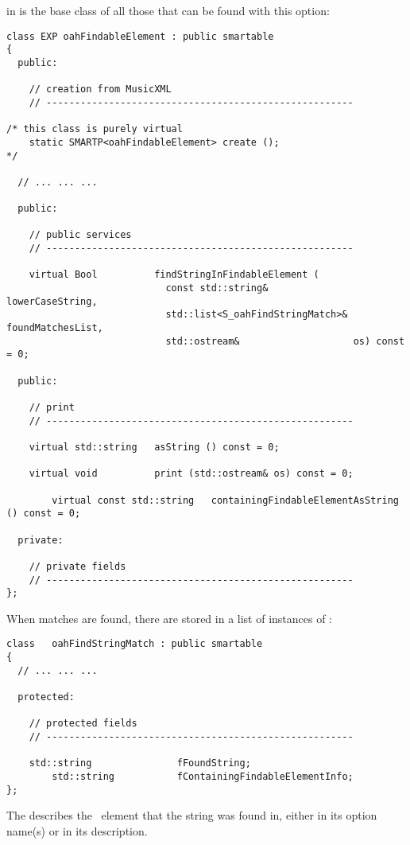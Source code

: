  in  is the base class   of all those that can be found with this  option:
\begin{lstlisting}[language=Terminal]
class EXP oahFindableElement : public smartable
{
  public:

    // creation from MusicXML
    // ------------------------------------------------------

/* this class is purely virtual
    static SMARTP<oahFindableElement> create ();
*/

  // ... ... ...

  public:

    // public services
    // ------------------------------------------------------

    virtual Bool          findStringInFindableElement (
                            const std::string&          lowerCaseString,
                            std::list<S_oahFindStringMatch>& foundMatchesList,
                            std::ostream&                    os) const = 0;

  public:

    // print
    // ------------------------------------------------------

    virtual std::string   asString () const = 0;

    virtual void          print (std::ostream& os) const = 0;

		virtual const std::string 	containingFindableElementAsString () const = 0;

  private:

    // private fields
    // ------------------------------------------------------
};
\end{lstlisting}

When matches are found, there are stored in a list of instances of :
\begin{lstlisting}[language=Terminal]
class   oahFindStringMatch : public smartable
{
  // ... ... ...

  protected:

    // protected fields
    // ------------------------------------------------------

    std::string			      fFoundString;
		std::string           fContainingFindableElementInfo;
};
\end{lstlisting}

The  describes the \oahRepr\ element that the string was found in, either in its option name(s) or in its description.

